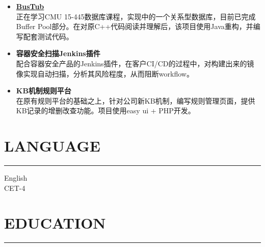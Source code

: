 \documentclass[11 pt, a4paper, usenames, dvipsnames]{article}
\newcommand*{\SectionFont}{%
      \fontsize{16}{5}%
\color{CV_Color}%
\bf
\selectfont}
\begin{document}
\begin{paracol}{2}
\begin{itemize}[leftmargin=0pt,align=left,labelwidth=\parindent,labelsep=0pt]
\item[] \href{https://github.com/CNYuYang/BusTub}{\textbf{BusTub}} \verb||\faGithub \enskip \\ 
正在学习CMU 15-445数据库课程，实现中的一个关系型数据库，目前已完成Buffer Pool部分。在对原C++代码阅读并理解后，该项目使用Java重构，并编写配套测试代码。

\item[] {\textbf{容器安全扫描Jenkins插件}}
\verb||\enskip \\ 
配合容器安全产品的Jenkins插件，在客户CI/CD的过程中，对构建出来的镜像实现自动扫描，分析其风险程度，从而阻断workflow。

\item[] {\textbf{KB机制规则平台}}
\verb||\enskip \\ 
在原有规则平台的基础之上，针对公司新KB机制，编写规则管理页面，提供KB记录的增删改查功能。项目使用easy ui + PHP开发。


\end{itemize}


\section*{\SectionFont\faComment\enskip LANGUAGE}\vspace{-15pt}
\par\noindent\rule{0.22\textwidth}{0.4pt}
\vspace{-1em}
\begin{itemize}[leftmargin=0pt,align=left,labelwidth=\parindent,labelsep=0pt]
\setlength{\columnsep}{0.2em}
\begin{multicols}{2}

\item[] {English} \\
{\color{CV_Color} CET-4}

\end{multicols}
\end{itemize}


\switchcolumn[1]


\section*{\SectionFont\faMortarBoard\enskip EDUCATION}\vspace{-15pt}
\par\noindent\rule{0.22\textwidth}{0.4pt} \vspace{0.4pt}
\begin{itemize}[leftmargin=0pt,align=left,labelwidth=\parindent,labelsep=0pt]
	

\end{itemize}
\end{paracol}
\end{document}
